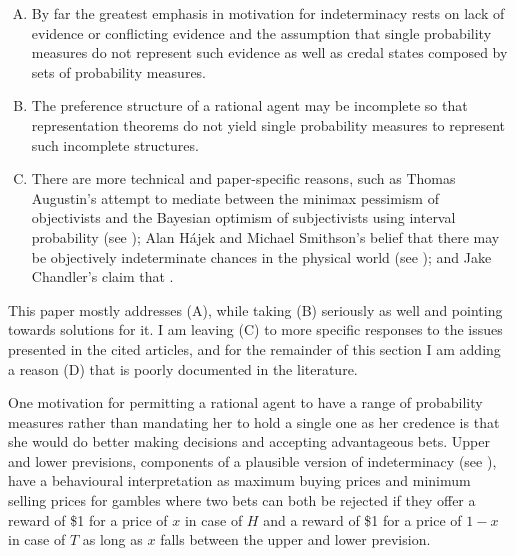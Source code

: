 \begin{enumerate}[(A)]
\item By far the greatest emphasis in motivation for
  indeterminacy rests on lack of evidence or
  conflicting evidence and the assumption that single
  probability measures do not represent such evidence
  as well as credal states composed by sets of
  probability measures.
\item The preference structure of a rational agent may
  be incomplete so that representation theorems do not
  yield single probability measures to represent such
  incomplete structures.
\item There are more technical and paper-specific
  reasons, such as Thomas Augustin's attempt to mediate
  between the minimax pessimism of objectivists and the
  Bayesian optimism of subjectivists using interval
  probability (see ); Alan
  H{\'a}jek and Michael Smithson's belief that there
  may be objectively indeterminate chances in the
  physical world (see );
  and Jake Chandler's claim that  .
\end{enumerate}

This paper mostly addresses (A), while taking (B)
seriously as well and pointing towards solutions for
it. I am leaving (C) to more specific responses to the
issues presented in the cited articles, and for the
remainder of this section I am adding a reason (D) that
is poorly documented in the literature.

One motivation for permitting a rational agent to have
a range of probability measures rather than mandating
her to hold a single one as her credence is that she
would do better making decisions and accepting
advantageous bets. Upper and lower previsions,
components of a plausible version of indeterminacy (see
), have a behavioural
interpretation as maximum buying prices and minimum
selling prices for gambles where two bets can both be
rejected if they offer a reward of \$1 for a price of
$x$ in case of $H$ and a reward of \$1 for a price of
$1-x$ in case of $T$ as long as $x$ falls between the
upper and lower prevision.

